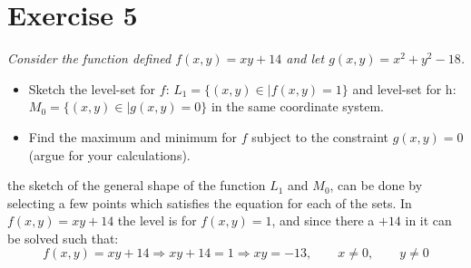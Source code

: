 \section{Exercise 5}
\textit{Consider the function defined $f(x,y) = xy+14$ and let
$g(x,y) = x^2+y^2-18$.}
\begin{itemize}
    \item Sketch the level-set for $f$: $L_1 = \{(x,y) \in | f(x,y) = 1\}$ and level-set for h: $M_0 = \{(x,y) \in | g(x,y) = 0\}$ in the same coordinate system.
    \item Find the maximum and minimum for $f$ subject to the constraint $g(x,y) = 0$ (argue for your calculations).
\end{itemize}
the sketch of the general shape of the function $L_1$ and $M_0$, can be done by selecting a few points which satisfies the equation
for each of the sets. In $f(x,y) = xy+14$ the level is for $f(x,y)=1$, and since there a $+14$ in it can be solved such that:
\[f(x,y) = xy+14 \Rightarrow xy+14=1 \Rightarrow xy=-13, \qquad x\neq 0, \qquad y\neq 0\]

